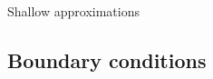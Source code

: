 \documentclass[aspectratio=1610]{beamer}
\begin{document}

    \begin{frame}{Shallow approximations}
      
    \end{frame}


\subsection{Boundary conditions}
\end{document}
